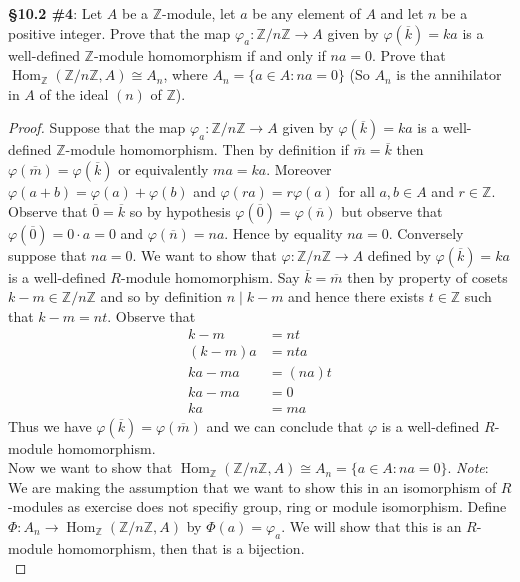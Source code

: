 \documentclass[8pt]{amsart}
\theoremstyle{plain}%
\theoremstyle{definition}
\theoremstyle{remark}
\numberwithin{equation}{section}
\newcommand{\Z}{\mathbb{Z}}
\begin{document}
\textbf{\S 10.2 \#4}: Let $A$ be a $\Z$-module, let $a$ be any element of $A$ and let $n$ be a positive integer. Prove that the map $\varphi_a : \Z/n\Z \to A$ given by $\varphi(\overline k) = ka$ is a well-defined $\mathbb Z$-module homomorphism if and only if $na = 0$. Prove that $\operatorname{Hom}_\Z(\Z/n\Z, A) \cong A_n$, where $A_n = \{a \in A : na = 0\}$ (So $A_n$ is the annihilator in $A$ of the ideal $(n)$ of $\Z$).
	\begin{proof}
		Suppose that the map $\varphi_a : \Z/n\Z \to A$ given by $\varphi(\overline k) = ka$ is a well-defined $\mathbb Z$-module homomorphism. Then by definition if $\overline m = \overline k$ then $\varphi(\overline m) = \varphi(\overline k)$ or equivalently $ma = ka$. Moreover $\varphi(a + b) = \varphi(a) + \varphi(b)$ and $\varphi(ra) = r\varphi(a)$ for all $a, b \in A$ and $r \in \Z$. Observe that $\overline 0 = \overline k$ so by hypothesis $\varphi(\overline 0) = \varphi(\overline n)$ but observe that $\varphi(\overline 0) = 0 \cdot a = 0$ and $\varphi(\overline n) = na$. Hence by equality $na = 0$. Conversely suppose that $na = 0$. We want to show that $\varphi : \Z/n\Z \to A$ defined by $\varphi(\overline k) = ka$ is a well-defined $R$-module homomorphism. Say $\overline k = \overline m$ then by property of cosets $k - m \in \Z/n\Z$ and so by definition $n \mid k - m$ and hence there exists $t \in \Z$ such that $k - m = nt$. Observe that
		\begin{align*}
			k - m &= nt\\
			(k - m)a &= nta\\
			ka - ma &= (na)t\\
			ka - ma &= 0\\
			ka &= ma 
		\end{align*}
		Thus we have $\varphi(\overline k) = \varphi(\overline m)$ and we can conclude that $\varphi$ is a well-defined $R$-module homomorphism.\\

		Now we want to show that $\operatorname{Hom}_\Z(\Z/n\Z, A) \cong A_n = \{a \in A : na = 0\}$. \textit{Note}: We are making the assumption that we want to show this in an isomorphism of $R$-modules as exercise does not specifiy group, ring or module isomorphism. Define $\Phi : A_n \to \operatorname{Hom}_\Z(\Z/n\Z, A)$ by $\Phi(a) = \varphi_a$. We will show that this is an $R$-module homomorphism, then that is a bijection.\\


\end{proof}
\end{document}
